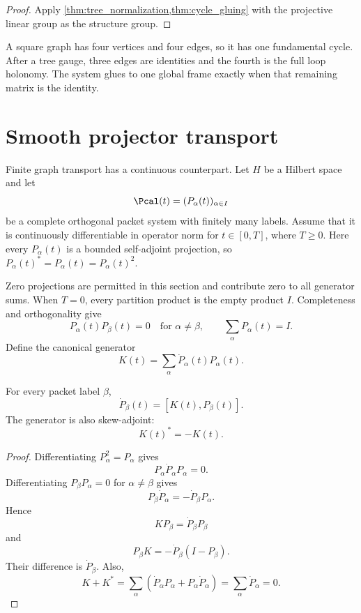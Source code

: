 \begin{proof}
Apply \cref{thm:tree_normalization,thm:cycle_gluing} with the projective linear group as the structure group.
\end{proof}

\begin{example}\label{ex:square_loop}
A square graph has four vertices and four edges, so it has one fundamental cycle.  After a tree gauge, three edges are identities and the fourth is the full loop holonomy.  The system glues to one global frame exactly when that remaining matrix is the identity.
\end{example}

\section{Smooth projector transport}\label{sec:kato_transport}

Finite graph transport has a continuous counterpart.  Let $H$ be a Hilbert space and let
\[
\Pcal(t)=(P_\alpha(t))_{\alpha\in I}
\]
be a complete orthogonal packet system with finitely many labels. Assume that it is continuously differentiable in operator norm for $t\in[0,T]$, where $T\ge0$. Here every $P_\alpha(t)$ is a bounded self-adjoint projection, so $P_\alpha(t)^*=P_\alpha(t)=P_\alpha(t)^2$.

Zero projections are permitted in this section and contribute zero to all generator sums. When $T=0$, every partition product is the empty product $I$. Completeness and orthogonality give
\[
P_\alpha(t)P_\beta(t)=0
\quad\text{for }\alpha\ne\beta,
\qquad
\sum_\alpha P_\alpha(t)=I.
\]
Define the canonical generator
\[
K(t)=\sum_\alpha \dot P_\alpha(t)P_\alpha(t).
\]

\begingroup
\setlength{\abovedisplayskip}{6pt plus 2pt minus 2pt}
\setlength{\belowdisplayskip}{6pt plus 2pt minus 2pt}
\begin{lemma}\label{lem:packet_commutator}
For every packet label $\beta$,
\[
\dot P_\beta(t)=[K(t),P_\beta(t)].
\]
The generator is also skew-adjoint:
\[
K(t)^*=-K(t).
\]
\end{lemma}

\begin{proof}
Differentiating $P_\alpha^2=P_\alpha$ gives
\[
P_\alpha\dot P_\alpha P_\alpha=0.
\]
Differentiating $P_\beta P_\alpha=0$ for $\alpha\ne\beta$ gives
\[
P_\beta\dot P_\alpha=-\dot P_\beta P_\alpha.
\]
Hence
\[
K P_\beta=\dot P_\beta P_\beta
\]
and
\[
P_\beta K=-\dot P_\beta(I-P_\beta).
\]
Their difference is $\dot P_\beta$.  Also,
\[
K+K^*
=
\sum_\alpha(\dot P_\alpha P_\alpha+P_\alpha\dot P_\alpha)
=
\sum_\alpha\dot P_\alpha
=0.
\]
\end{proof}
\endgroup


